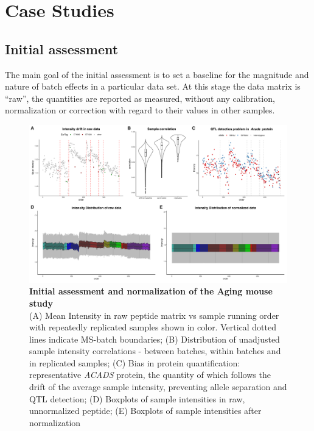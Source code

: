 \documentclass[num-refs]{wiley-article}
\begin{document}
\section{Case Studies}\label{subsec:case_studies}
\subsection{Initial assessment}
The main goal of the initial assessment is to set a baseline for the magnitude and nature of batch effects in a particular data set. At this stage the data matrix is “raw”, the quantities are reported as measured, without any calibration, normalization or correction with regard to their values in other samples.


\begin{figure}[hbt]
	\includegraphics[width=\textwidth]{figures/Fig1_initial_assessment_v5_edited.pdf}
	
	\caption{\textbf{Initial assessment and normalization of the Aging mouse study} \\
		\footnotesize
		(A) Mean Intensity in raw peptide matrix vs sample running order with repeatedly replicated samples shown in color. Vertical dotted lines indicate MS-batch boundaries; (B) Distribution of unadjusted sample intensity correlations - between batches, within batches and in replicated samples; (C) Bias in protein quantification: representative \textit{ACADS} protein, the quantity of which follows the drift of the average sample intensity, preventing allele separation and QTL detection; (D) Boxplots of sample intensities in raw, unnormalized peptide; (E) Boxplots of sample intensities after normalization}
	\label{fig:batch_fig2_initAssessment}
\end{figure}
\end{document}
